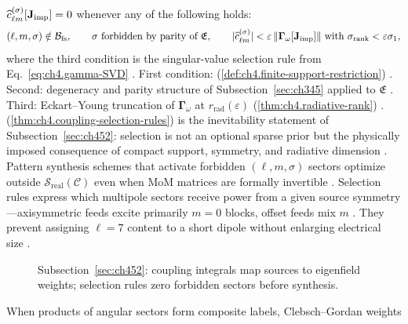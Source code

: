 \(\widehat{c}_{\ell m}^{(\sigma)}[\mathbf{J}_{\mathrm{imp}}]=0\) whenever any of the following holds:
\begin{equation}
\label{eq:ch4.selection-rules-list}
(\ell,m,\sigma)\notin\mathcal{B}_{\mathrm{fs}},
\qquad
\sigma\ \text{forbidden by parity of }\mathfrak{E},
\qquad
|\widehat{c}_{\ell m}^{(\sigma)}|
<
\varepsilon\,\|\boldsymbol{\Gamma}_\omega[\mathbf{J}_{\mathrm{imp}}]\|
\ \text{with}\ \sigma_{\mathrm{rank}}<\varepsilon\sigma_{1},
\end{equation}
where the third condition is the singular-value selection rule from
Eq.~\eqref{eq:ch4.gamma-SVD} \cite{stratton1941}.
First condition: (\ref{def:ch4.finite-support-restriction}) \cite{hansen1988}. Second: degeneracy and parity
structure of Subsection~\ref{sec:ch345} applied to \(\mathfrak{E}\) \cite{jackson1999}. Third:
Eckart--Young truncation of \(\boldsymbol{\Gamma}_\omega\) at \(r_{\mathrm{rad}}(\varepsilon)\)
(\ref{thm:ch4.radiative-rank}) \cite{harrington2001}.
(\ref{thm:ch4.coupling-selection-rules}) is the inevitability statement of Subsection~\ref{sec:ch452}: selection is
not an optional sparse prior but the physically imposed consequence of compact support, symmetry, and radiative dimension
\cite{devaney2004}. Pattern synthesis schemes that activate forbidden \((\ell,m,\sigma)\) sectors optimize outside
\(\mathcal{S}_{\mathrm{real}}(\mathcal{C})\) even when MoM matrices are formally invertible \cite{harrington2001}.
Selection rules express which multipole sectors receive power from a given source symmetry---axisymmetric feeds excite primarily $m=0$ blocks, offset feeds mix $m$ \cite{jackson1999}. They prevent assigning $\ell=7$ content to a short dipole without enlarging electrical size \cite{harrington2001}.
\begin{figure}[t]
\centering
{}
\caption{Subsection~\ref{sec:ch452}: coupling integrals map sources to eigenfield weights; selection rules zero
forbidden sectors before synthesis.}
\label{fig:ch4.coupling-selection-chain}
\end{figure}
When products of angular sectors form composite labels, Clebsch--Gordan weights
